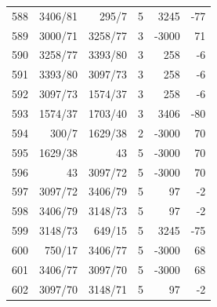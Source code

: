\documentclass[11pt,a4paper]{article}
\begin{document}
\begin{minipage}[t]{.49\linewidth}
\begin{tabular*}{\linewidth}{@{}r@{\extracolsep{\fill}}rrrrr@{}}
588 & 3406/81 & 295/7 & 5 & 3245 & -77\\
589 & 3000/71 & 3258/77 & 3 & -3000 & 71\\
590 & 3258/77 & 3393/80 & 3 & 258 & -6\\
591 & 3393/80 & 3097/73 & 3 & 258 & -6\\
592 & 3097/73 & 1574/37 & 3 & 258 & -6\\
593 & 1574/37 & 1703/40 & 3 & 3406 & -80\\
594 & 300/7 & 1629/38 & 2 & -3000 & 70\\
595 & 1629/38 & 43 & 5 & -3000 & 70\\
596 & 43 & 3097/72 & 5 & -3000 & 70\\
597 & 3097/72 & 3406/79 & 5 & 97 & -2\\
598 & 3406/79 & 3148/73 & 5 & 97 & -2\\
599 & 3148/73 & 649/15 & 5 & 3245 & -75\\
600 & 750/17 & 3406/77 & 5 & -3000 & 68\\
601 & 3406/77 & 3097/70 & 5 & -3000 & 68\\
602 & 3097/70 & 3148/71 & 5 & 97 & -2\\
\bottomrule\end{tabular*}\end{minipage}\par
\clearpage
{}\par\vspace{4pt}
\end{document}

